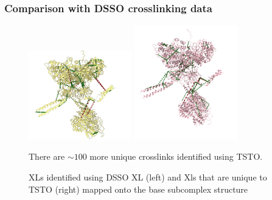 \documentclass[a4paper,8pt]{beamer}
\begin{document}
\begin{frame}
\frametitle{Comparison with DSSO crosslinking data}
  \begin{figure}
   \centering
   \includegraphics[width=0.4\textwidth]{figures/dsso-mapped-xls.png}
   \includegraphics[width=0.4\textwidth]{test-figures/unique_to_tsto.png}
   \caption{XLs identified using DSSO XL (left) and Xls that are unique to TSTO (right) mapped onto the base subcomplex structure}
   There are $\sim 100$ more unique crosslinks identified using TSTO.
  \end{figure}
\end{frame}
%
\end{document}
